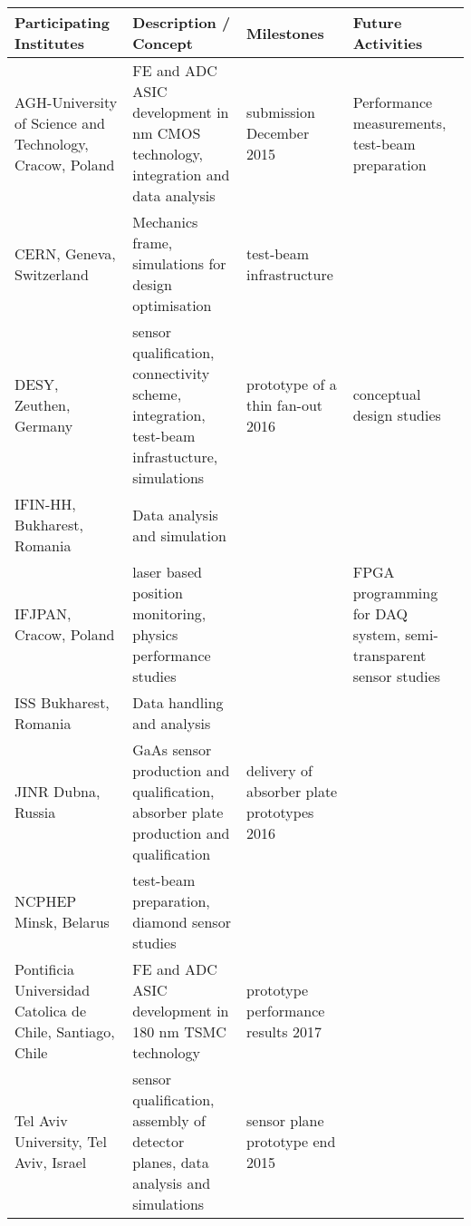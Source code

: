 \thispagestyle{empty}
\begin{landscape}
    \centering
\begin{sidewaystable}
    \centering
    \begin{adjustbox}{max width=1.1\textwidth,totalheight=1\textheight}
\begin{tabularx}{1.1\textheight}{XXXX}
    \toprule
    Participating Institutes & Description / Concept & Milestones & Future Activities \\
    \midrule
     AGH-University of Science and Technology, Cracow, Poland &
     FE and ADC ASIC development in \unit[130]{nm} CMOS technology, integration and data analysis &
     submission December 2015 &
     Performance measurements, test-beam preparation \\
     \midrule
     CERN, Geneva, Switzerland &
     Mechanics frame, simulations for design optimisation &
     test-beam infrastructure \\
     \midrule
     DESY, Zeuthen, Germany &
     sensor qualification, connectivity scheme, integration, test-beam infrastucture, simulations &
     prototype of a thin fan-out 2016 &
     conceptual design studies\\
     \midrule
     IFIN-HH, Bukharest, Romania &
     Data analysis and simulation & & \\
     \midrule
     IFJPAN, Cracow, Poland &
     laser based position monitoring, physics performance studies &
     &
     FPGA programming for DAQ system, semi-transparent sensor studies \\
     \midrule
     ISS Bukharest, Romania &
     Data handling and analysis & & \\
     \midrule
     JINR Dubna, Russia &
     GaAs sensor production and qualification, absorber plate production and qualification &
     delivery of absorber plate prototypes 2016 & \\
     \midrule
     NCPHEP Minsk, Belarus &
     test-beam preparation, diamond sensor studies & & \\
     \midrule
     Pontificia Universidad Catolica de Chile, Santiago, Chile &
     FE and ADC ASIC development in 180 nm TSMC technology &
     prototype performance results 2017 & \\
     \midrule
     Tel Aviv University, Tel Aviv, Israel &
     sensor qualification, assembly of detector planes, data analysis and simulations &
     sensor plane prototype end 2015 & \\

\end{tabularx}
\end{adjustbox}
\end{sidewaystable}
\end{landscape}
